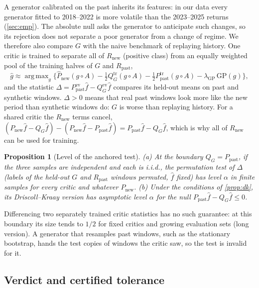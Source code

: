 \documentclass[11pt,a4paper]{article}
\theoremstyle{plain}
\newtheorem{proposition}{Proposition}
\DeclareMathOperator*{\argmax}{arg\,max}
\newcommand{\Rpast}{R_{\mathrm{past}}}
\newcommand{\Rnew}{R_{\mathrm{new}}}
\newcommand{\Ppast}{P_{\mathrm{past}}}
\newcommand{\Pnew}{P_{\mathrm{new}}}
\newcommand{\QG}{Q_{G}}
\newcommand{\trn}{\mathrm{tr}}
\newcommand{\evl}{\mathrm{ev}}
\newcommand{\fhat}{\widehat{f}}
\newcommand{\ghat}{\widehat{g}}
\newcommand{\lgp}{\lambda_{\mathrm{GP}}}
\newcommand{\Danc}{\Delta}
\begin{document}
A generator calibrated on the past inherits its features: in our data every generator fitted to
2018--2022 is more volatile than the 2023--2025 returns (\cref{sec:emp}). The absolute null asks the
generator to anticipate such changes, so its rejection does not separate a poor generator from a
change of regime. We therefore also compare $G$ with the naive benchmark of replaying history. One
critic is trained to separate all of $\Rnew$ (positive class) from an equally weighted pool of the
training halves of $G$ and $\Rpast$,
\begin{equation}\label{eq:anc}
  \ghat\approx\argmax_g\big\{\widehat P_{\mathrm{new}}(g\circ A)-\tfrac12\QG^{\trn}(g\circ A)
  -\tfrac12\Ppast^{\trn}(g\circ A)-\lgp\,\mathrm{GP}(g)\big\},
\end{equation}
and the statistic $\Danc=\Ppast^{\evl}\fhat-\QG^{\evl}\fhat$ compares its held-out means on past and
synthetic windows. $\Danc>0$ means that real past windows look more like the new period than
synthetic windows do: $G$ is worse than replaying history. For a shared critic the $\Rnew$ terms cancel,
$(\Pnew\fhat-\QG\fhat)-(\Pnew\fhat-\Ppast\fhat)=\Ppast\fhat-\QG\fhat$, which is why all of $\Rnew$
can be used for training.

\begin{proposition}[Level of the anchored test]\label{prop:anc}
(a) At the boundary $\QG=\Ppast$, if the three samples are independent and each is i.i.d., the
permutation test of $\Danc$ (labels of the held-out $G$ and $\Rpast$ windows permuted, $\fhat$
fixed) has level $\alpha$ in finite samples for every critic and whatever $\Pnew$. (b) Under the
conditions of \cref{prop:dk}, its Driscoll--Kraay version has asymptotic level $\alpha$ for the
null $\Ppast\fhat-\QG\fhat\le0$.
\end{proposition}

Differencing two separately trained critic statistics has no such guarantee: at this boundary its
size tends to $1/2$ for fixed critics and growing evaluation sets (long version). A generator that
resamples past windows, such as the stationary bootstrap, hands the test copies of windows the
critic saw, so the test is invalid for it.

\subsection{Verdict and certified tolerance}\label{sec:method-verdict}
\end{document}
